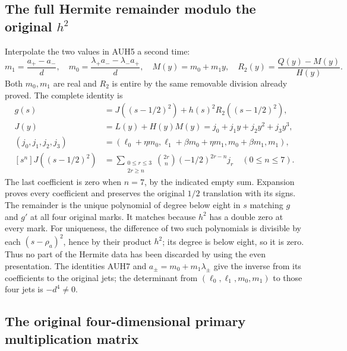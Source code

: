 \subsection{The full Hermite remainder modulo the original $h^2$}

Interpolate the two values in AUH5 a second time:
\[
 m_1=\frac{a_+-a_-}{d},\quad
 m_0=\frac{\lambda_+a_--\lambda_-a_+}{d},\quad
M(y)=m_0+m_1y,\quad
 R_2(y)=\frac{Q(y)-M(y)}{H(y)}.
 \tag{AUH9}
\]
Both $m_0,m_1$ are real and $R_2$ is entire by the same removable
division already proved.  The complete identity is
\[
\begin{aligned}
 g(s)&=J((s-1/2)^2)+h(s)^2R_2((s-1/2)^2),\\
 J(y)&=L(y)+H(y)M(y)=j_0+j_1y+j_2y^2+j_3y^3,\\
 (j_0,j_1,j_2,j_3)&=(\ell_0+\eta m_0,
       \ell_1+\beta m_0+\eta m_1,m_0+\beta m_1,m_1),\\
 [s^n]J((s-1/2)^2)&=
   \sum_{\substack{0\le r\le3\\2r\ge n}}
     \binom{2r}{n}(-1/2)^{2r-n}j_r\quad(0\le n\le7).
\end{aligned}\tag{AUH10}
\]
The last coefficient is zero when $n=7$, by the indicated empty sum.
Expansion proves every coefficient and preserves the original
$1/2$ translation with its signs.
The remainder is the unique polynomial of degree below eight in
$s$ matching $g$ and $g'$ at all four original marks.
It matches because $h^2$ has a double zero at every mark.
For uniqueness, the difference of two such polynomials is divisible
by each $(s-\rho_a)^2$, hence by their product $h^2$; its degree
is below eight, so it is zero.
Thus no part of the Hermite data has been discarded by using the
even presentation.  The identities AUH7 and
$a_\pm=m_0+m_1\lambda_\pm$ give the inverse from its coefficients
to the original jets; the determinant from
$(\ell_0,\ell_1,m_0,m_1)$ to those four jets is $-d^4\ne0$.

\subsection{The original four-dimensional primary multiplication matrix}

